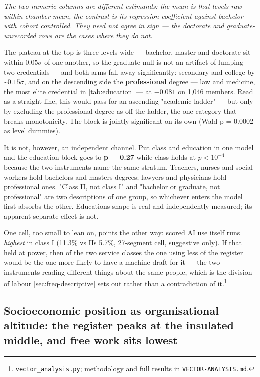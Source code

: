 \emph{The two numeric columns are different estimands: the mean is that level\textquotesingle s raw
within-chamber mean, the contrast is its regression coefficient against
bachelor with cohort controlled. They need not agree in sign --- the doctorate
and graduate-unrecorded rows are the cases where they do not.}

The plateau at the top is three levels wide --- bachelor, master and
doctorate sit within \(0.05\sigma\) of one another, so the graduate null is not an
artifact of lumping two credentials --- and both arms fall away
significantly: secondary and college by \textasciitilde\(0.15\sigma\), and on the descending side
the \textbf{professional} degree --- law and medicine, the most elite credential in \cref{tab:education} --- at \(-0.081\) on 1,046 members. Read as a straight line, this
would pass for an ascending "academic ladder" --- but only by excluding the
professional degree as off the ladder, the one category that breaks
monotonicity. The block is jointly significant on its own (Wald p = 0.0002
as level dummies).

It is not, however, an independent channel. Put class and education in one
model and the education block goes to \textbf{p = 0.27} while class holds at
\textbf{\(p < 10^{-4}\)} --- because the two instruments name the same stratum. Teachers,
nurses and social workers hold bachelor\textquotesingle s and master\textquotesingle s degrees; lawyers and
physicians hold professional ones. "Class II, not class I" and "bachelor or
graduate, not professional" are two descriptions of one group, so whichever
enters the model first absorbs the other. Education\textquotesingle s shape is real and
independently measured; its apparent separate effect is not.

One cell, too small to lean on, points the other way: scored AI use itself
runs \emph{highest} in class I (11.3\% vs II\textquotesingle s 5.7\%, 27-segment cell, suggestive
only). If that held at power, then of the two service classes the one using
less of the register would be the one more likely to have a machine draft for
it --- the two instruments reading different things about the same people, which
is the division of labour \cref{sec:freq-descriptive} sets out rather than a contradiction of
it.\footnote{\texttt{vector\_analysis.py}; methodology and full results in
  \texttt{VECTOR-ANALYSIS.md}.}

\subsection{Socioeconomic position as organisational altitude: the register peaks at the insulated middle, and free work sits lowest}\label{sec:occupation}

